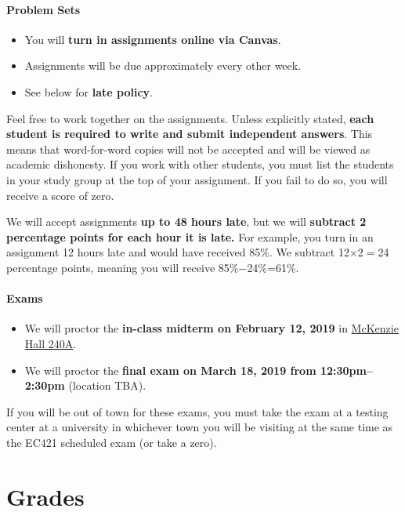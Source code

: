 \documentclass[10pt]{article}
\begin{document}
\paragraph{Problem Sets}
\begin{itemize}
  \item You will \textbf{turn in assignments online via Canvas}.
  \item Assignments will be due approximately every other week.
  \item See below for \textbf{late policy}.
\end{itemize}
Feel free to work together on the assignments. Unless explicitly stated, \textbf{each student is required to write and submit independent answers}. This means that word-for-word copies will not be accepted and will be viewed as academic dishonesty. If you work with other students, you must list the students in your study group at the top of your assignment. If you fail to do so, you will receive a score of zero.

We will accept assignments \textbf{up to 48 hours late}, but we will \textbf{subtract 2 percentage points for each hour it is late.} For example, you turn in an assignment 12 hours late and would have received 85\%. We subtract 12$\times$2$=$24 percentage points, meaning you will receive 85\%$-$24\%=61\%.

\paragraph{Exams}
\begin{itemize}
  \item We will proctor the \textbf{in-class midterm on February 12, 2019} in \href{https://map.uoregon.edu/c721c7d95}{McKenzie Hall 240A}.
  \item We will proctor the \textbf{final exam on March 18, 2019 from 12:30pm--2:30pm} (location TBA).
\end{itemize}
If you will be out of town for these exams, you must take the exam at a testing center at a university in whichever town you will be visiting at the same time as the EC421 scheduled exam (or take a zero).

\section*{Grades}
\end{document}
